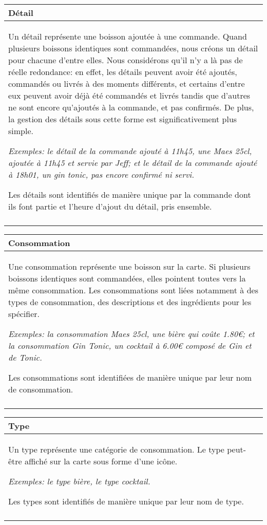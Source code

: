 \documentclass[a4paper,10pt]{article}
\begin{document}
\begin{tabu}{X}
\textbf{Détail} \\
\toprule

Un détail représente une boisson ajoutée à une commande. Quand plusieurs boissons identiques sont commandées, nous créons un détail pour chacune d'entre elles. Nous considérons qu'il n'y a là pas de réelle redondance: en effet, les détails peuvent avoir été ajoutés, commandés ou livrés à des moments différents, et certains d'entre eux peuvent avoir déjà été commandés et livrés tandis que d'autres ne sont encore qu'ajoutés à la commande, et pas confirmés. De plus, la gestion des détails sous cette forme est significativement plus simple.

\textsl{Exemples: le détail de la commande  ajouté à 11h45, une Maes 25cl, ajoutée à 11h45 et servie par Jeff; et le détail de la commande  ajouté à 18h01, un gin tonic, pas encore confirmé ni servi.}

Les détails sont identifiés de manière unique par la commande dont ils font partie et l'heure d'ajout du détail, pris ensemble. \\\\
\end{tabu}

\begin{tabu}{X}
\textbf{Consommation} \\
\toprule

Une consommation représente une boisson sur la carte. Si plusieurs boissons identiques sont commandées, elles pointent toutes vers la même consommation. Les consommations sont liées notamment à des types de consommation, des descriptions et des ingrédients pour les spécifier.
    
\textsl{Exemples: la consommation Maes 25cl, une bière qui coûte 1.80€; et la consommation Gin Tonic, un cocktail à 6.00€ composé de Gin et de Tonic.}

Les consommations sont identifiées de manière unique par leur nom de consommation. \\\\
\end{tabu}

\begin{tabu}{X}
\textbf{Type} \\
\toprule

Un type représente une catégorie de consommation. Le type peut-être affiché sur la carte sous forme d'une icône.

\textsl{Exemples: le type bière, le type cocktail.}

Les types sont identifiés de manière unique par leur nom de type. \\\\
\end{tabu}
\end{document}
